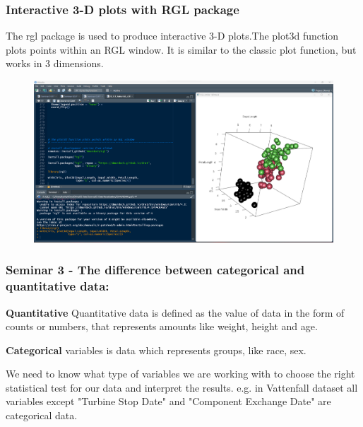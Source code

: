 \documentclass{beamer}
\begin{document}

\begin{frame}[fragile] %
\frametitle{Interactive 3-D plots with RGL package}

\begin{example} 
The rgl package is used to produce interactive 3-D plots.The plot3d function plots points within an RGL window. It is similar to the classic plot function, but works in 3 dimensions.


\end{example}
\begin{figure}
\includegraphics[width=0.8\linewidth]{Seminar_3_images/R/13.png}
\end{figure}
\end{frame}





\begin{frame}
\frametitle{Seminar 3 - The difference between categorical and quantitative data:}
\textbf{Quantitative} Quantitative data is defined as the value of data in the form of counts or numbers, that represents amounts like weight, height and age.\newline

\textbf{Categorical} variables is data which represents groups, like race, sex.\newline

We need to know what type of variables we are working with to choose the right statistical test for our data and interpret the results. e.g. in Vattenfall dataset all variables except "Turbine Stop Date" and "Component Exchange Date" are categorical data.
\end{frame}
\end{document}
